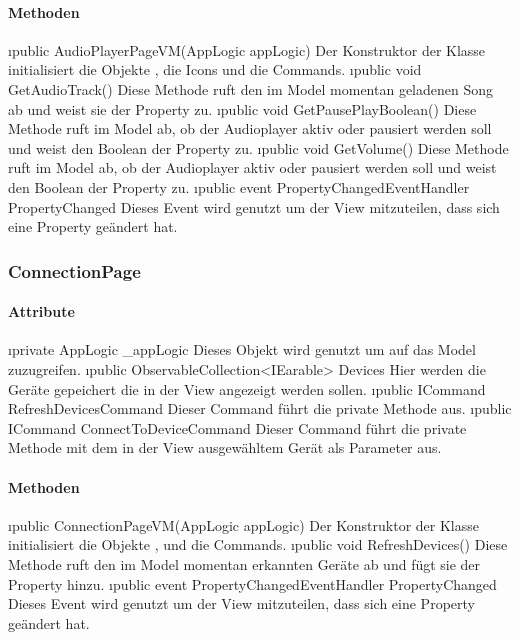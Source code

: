 \documentclass[../entwurf.tex]{subfiles}
\begin{document}
\paragraph{Methoden}
\begin{itemize}
	\i{public AudioPlayerPageVM(AppLogic appLogic)} Der Konstruktor der Klasse initialisiert die Objekte , die Icons und die Commands.
	\i{public void GetAudioTrack()} Diese Methode ruft den im Model momentan geladenen Song ab und weist sie der Property  zu.
	\i{public void GetPausePlayBoolean()} Diese Methode ruft im Model ab, ob der Audioplayer aktiv oder pausiert werden soll und weist den Boolean der Property  zu.
	\i{public void GetVolume()} Diese Methode ruft im Model ab, ob der Audioplayer aktiv oder pausiert werden soll und weist den Boolean der Property  zu.
	\i{public event PropertyChangedEventHandler PropertyChanged} Dieses Event wird genutzt um der View mitzuteilen, dass sich eine Property geändert hat.
\end{itemize}
\subsubsection{ConnectionPage}
\paragraph{Attribute}
\begin{itemize}
	\i{private AppLogic \_appLogic} Dieses Objekt wird genutzt um auf das Model zuzugreifen.
	\i{public ObservableCollection<IEarable> Devices} Hier werden die Geräte gepeichert die in der View angezeigt werden sollen.
	\i{public ICommand RefreshDevicesCommand} Dieser Command führt die private Methode  aus.
	\i{public ICommand ConnectToDeviceCommand} Dieser Command führt die private Methode  mit dem in der View ausgewähltem Gerät als Parameter aus.
\end{itemize}
\paragraph{Methoden}
\begin{itemize}
	\i{public ConnectionPageVM(AppLogic appLogic)} Der Konstruktor der Klasse initialisiert die Objekte ,  und die Commands.
	\i{public void RefreshDevices()} Diese Methode ruft den im Model momentan erkannten Geräte ab und fügt sie der Property  hinzu.
	\i{public event PropertyChangedEventHandler PropertyChanged} Dieses Event wird genutzt um der View mitzuteilen, dass sich eine Property geändert hat.
\end{itemize}
\end{document}
